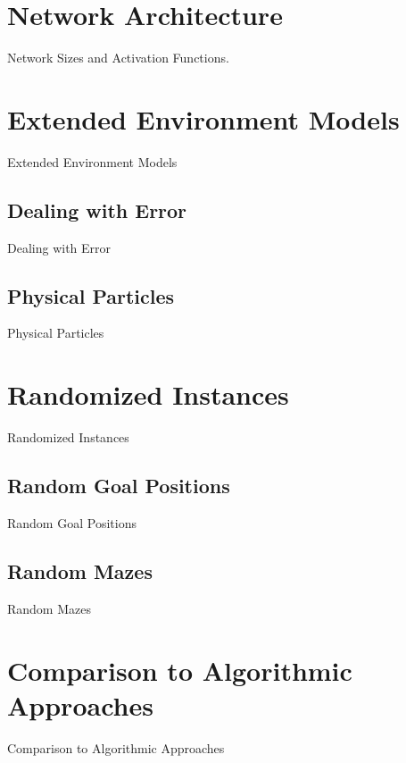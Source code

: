 \section{Network Architecture}
Network Sizes and Activation Functions.

\section{Extended Environment Models} \label{sec:EvalExtendedModels}
Extended Environment Models
\subsection{Dealing with Error} \label{sec:EvalError}
Dealing with Error
\subsection{Physical Particles} \label{sec:EvalPhysical}
Physical Particles
\section{Randomized Instances} \label{sec:EvalRandomness}
Randomized Instances
\subsection{Random Goal Positions} \label{sec:EvalRandomGoals}
Random Goal Positions
\subsection{Random Mazes} \label{sec:EvalRandomMaze}
Random Mazes
\section{Comparison to Algorithmic Approaches} \label{sec:EvalAlgorithms}
Comparison to Algorithmic Approaches